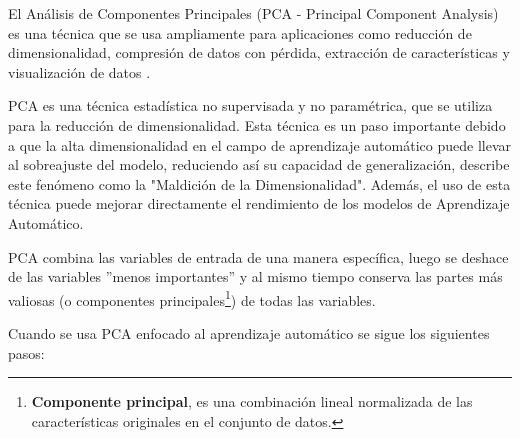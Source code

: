 \vspace{5mm} %

El An\'{a}lisis de Componentes Principales (PCA - Principal Component Analysis) es una técnica que se usa ampliamente para aplicaciones como reducción de dimensionalidad, compresión de datos con pérdida, extracción de características y visualización de datos \cite{Reference39}.

\vspace{5mm} %

PCA es una t\'{e}cnica estad\'{i}stica no supervisada y no param\'{e}trica, que se utiliza para la reducci\'{o}n de dimensionalidad. Esta t\'{e}cnica es un paso importante debido a que la alta dimensionalidad en el campo de aprendizaje autom\'{a}tico puede llevar al sobreajuste del modelo, reduciendo as\'{i} su capacidad de generalizaci\'{o}n,  describe este fen\'{o}meno como la "Maldici\'{o}n de la Dimensionalidad". Adem\'{a}s, el uso de esta t\'{e}cnica puede mejorar directamente el rendimiento de los modelos de Aprendizaje Autom\'{a}tico.

\vspace{5mm} %

PCA combina las variables de entrada de una manera espec\'{i}fica, luego se deshace de las variables ''menos importantes'' y al mismo tiempo conserva las partes m\'{a}s valiosas (o componentes principales\footnote{\textbf{Componente principal}, es una combinaci\'{o}n lineal normalizada de las caracter\'{i}sticas originales en el conjunto de datos.}) de todas las variables.

\vspace{5mm} %

Cuando se usa PCA enfocado al aprendizaje autom\'{a}tico se sigue los siguientes pasos:

